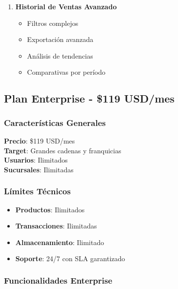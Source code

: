 \documentclass[12pt,a4paper]{article}
\begin{document}
\begin{enumerate}
    \item \textbf{Historial de Ventas Avanzado}
    \begin{itemize}
        \item Filtros complejos
        \item Exportación avanzada
        \item Análisis de tendencias
        \item Comparativas por período
    \end{itemize}
\end{enumerate}

\subsection{Plan Enterprise - \$119 USD/mes}

\subsubsection{Características Generales}

\begin{tcolorbox}[colback=warningorange!10, colframe=warningorange, title=Plan Enterprise]
    \textbf{Precio}: \$119 USD/mes\\
    \textbf{Target}: Grandes cadenas y franquicias\\
    \textbf{Usuarios}: Ilimitados\\
    \textbf{Sucursales}: Ilimitadas
\end{tcolorbox}

\subsubsection{Límites Técnicos}

\begin{itemize}
    \item \textbf{Productos}: Ilimitados
    \item \textbf{Transacciones}: Ilimitadas
    \item \textbf{Almacenamiento}: Ilimitado
    \item \textbf{Soporte}: 24/7 con SLA garantizado
\end{itemize}

\subsubsection{Funcionalidades Enterprise}
\end{document}
